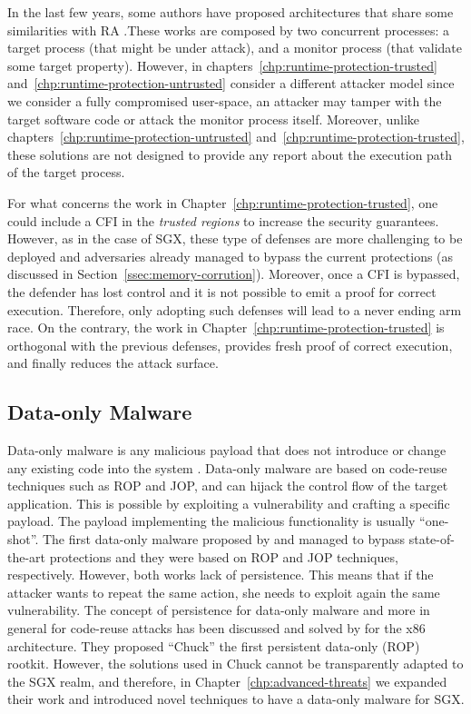 In the last few years, some authors have proposed architectures that share some 
similarities with RA 
\citep{Ding:2017:EPP:3241189.3241201,Liu:2018:RED:3243734.3243826,hu2018enforcing}.These
works are composed by two concurrent processes: a target process (that might 
be under attack), and a monitor process (that validate some target property).
However, in chapters~\ref{chp:runtime-protection-trusted} 
and~\ref{chp:runtime-protection-untrusted} consider a different attacker model 
since we consider a fully compromised user-space, \ie an attacker may tamper 
with the target software code or attack the monitor process itself. 
Moreover, unlike chapters~\ref{chp:runtime-protection-untrusted} 
and~\ref{chp:runtime-protection-trusted}, these solutions are not designed to 
provide any report about the execution path of the target process. 

For what concerns the work in Chapter~\ref{chp:runtime-protection-trusted}, one 
could include a CFI in the \emph{trusted regions} to increase the security 
guarantees. However, as in the case of SGX, these type of defenses are more 
challenging to be deployed and adversaries already managed to bypass the
current protections (as discussed in Section~\ref{ssec:memory-corrution}).
Moreover, once a CFI is bypassed, the defender has lost control and it is not 
possible to emit a proof for correct execution.
Therefore, only adopting such defenses will lead to a never ending arm race.
On the contrary, the work in Chapter~\ref{chp:runtime-protection-trusted} is 
orthogonal with the previous defenses, provides fresh proof of correct 
execution, and finally reduces the attack surface.

\subsection{Data-only Malware}
\label{ssec:data-only-malware}

Data-only malware is any malicious payload that does not introduce or change 
any existing code into the system \citep{vogl2014persistent}.
Data-only malware are based on code-reuse techniques such as ROP and JOP, and 
can hijack the control flow of the target application. This is possible by 
exploiting a vulnerability and crafting a specific payload.
The payload implementing the malicious functionality is usually ``one-shot''. 
The first data-only malware proposed by \cite{hund} and \cite{chen} managed to 
bypass state-of-the-art 
protections and they were based on ROP and JOP techniques, respectively.
However, both works lack of persistence.
This means that if the attacker wants to repeat the same action, she needs to 
exploit again the same vulnerability.
The concept of persistence for data-only malware and more in general for 
code-reuse attacks has been discussed and solved by \cite{vogl2014persistent} 
for the x86 architecture. They proposed ``Chuck'' the first persistent 
data-only (ROP) rootkit. 
However, the solutions used in Chuck cannot be transparently adapted to the SGX 
realm, and therefore, in Chapter~\ref{chp:advanced-threats} we expanded their 
work and introduced novel techniques to have a data-only malware for SGX.